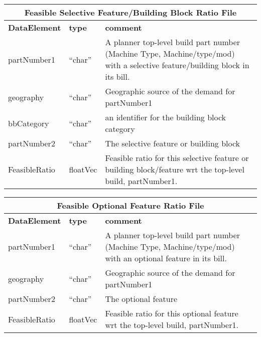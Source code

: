 \vspace{.5in}

\begin{tabular}{llp{4in}}
\multicolumn{3}{c}{{\bf Feasible Selective Feature/Building Block Ratio File}}\\ \hline\hline
{\bf DataElement} &  {\bf type}  &   {\bf comment} \\ \hline
partNumber1  & ``char'' &       A planner top-level build part number 
                            (Machine Type, Machine/type/mod)
                            with a selective feature/building block in its bill.  \\
geography   & ``char''    &      Geographic source of the demand for partNumber1 \\
bbCategory &  ``char'' &    an identifier for the building block category  \\
partNumber2  & ``char'' &      The selective feature or building block \\

FeasibleRatio    & floatVec &   Feasible ratio for this selective feature or 
                            building block/feature wrt the top-level build, partNumber1. \\
\end{tabular}

\vspace{.5in}

\begin{tabular}{llp{4in}}
\multicolumn{3}{c}{{\bf Feasible Optional Feature Ratio File}}\\ \hline\hline
{\bf DataElement} &  {\bf type}  &   {\bf comment} \\ \hline
partNumber1  & ``char'' &       A planner top-level build part number 
                            (Machine Type, Machine/type/mod)
                            with an optional feature in its bill.  \\
geography    & ``char'' &      Geographic source of the demand for partNumber1 \\
partNumber2  & ``char'' &      The optional feature \\

FeasibleRatio    & floatVec &   Feasible ratio for this optional feature wrt
                        the top-level build, partNumber1. \\
\end{tabular}

\vspace{.5in}

